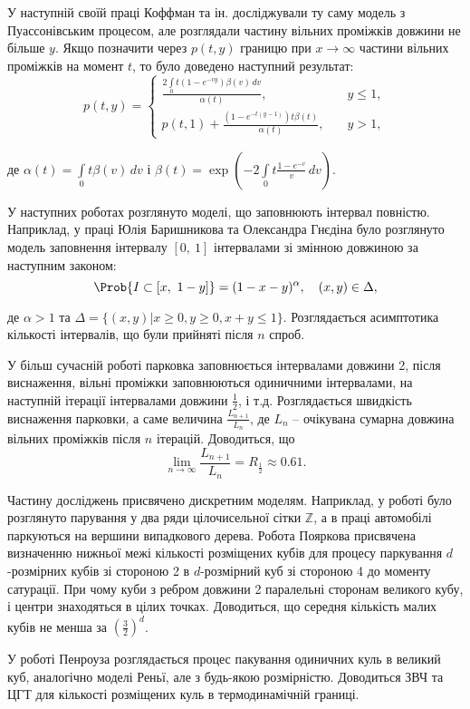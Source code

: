 У наступній своїй праці \cite{coffman2000parking} Коффман та ін. досліджували ту саму модель з Пуассонівським процесом, але розглядали частину вільних проміжків довжини не більше $y$. Якщо позначити через $p(t,y)$ границю при $x \rightarrow \infty$ частини вільних проміжків на момент $t$, то було доведено наступний результат:
\begin{equation}
p(t,y)=\begin{cases}
\frac{2\int\limits_{0}{t} (1 - e^{-vy})\beta(v)\,dv}{\alpha(t)}, &\quad y \leq 1,\\
p(t,1) + \frac{(1 - e^{-t(y-1)})t\beta(t)}{\alpha(t)}, &\quad y > 1,
\end{cases}
\end{equation}

де $\alpha(t) = \int\limits_{0}{t}\beta(v)\,dv$ і $\beta(t) = \exp\left(-2\int\limits_{0}{t} \frac{1 - e^{-v}}{v}\,dv\right)$.

У наступних роботах розглянуто моделі, що заповнюють інтервал повністю. Наприклад, у праці Юлія Баришникова та Олександра Гнєдіна \cite{baryshnikov1962} було розглянуто модель заповнення інтервалу $[0,~1]$ інтервалами зі змінною довжиною за наступним законом:
\begin{equation}
\Prob{I \subset [x,~ 1 - y]} = (1 - x - y)^\alpha, \quad (x,y) \in \Delta,
\end{equation}

де $\alpha > 1$ та $\Delta =\{(x,y)| x \geq 0, y \geq 0, x + y \leq 1 \}$. Розглядається асимптотика кількості інтервалів, що були прийняті після $n$ спроб.

У більш сучасній роботі \cite{exhaustion2017mackey} парковка заповнюється інтервалами довжини 2, після виснаження, вільні проміжки заповнюються одиничними інтервалами, на наступній ітерації інтервалами довжини $\frac{1}{2}$, і т.д. Розглядається швидкість виснаження парковки, а саме величина $\frac{L_{n+1}}{L_{n}}$, де $L_{n}$ -- очікувана сумарна довжина вільних проміжків після $n$ ітерацій. Доводиться, що
\begin{equation}
\lim\limits_{n \rightarrow \infty} \frac{L_{n+1}}{L_{n}} = R_{\frac{1}{2}} \approx 0.61.
\end{equation}

Частину досліджень присвячено дискретним моделям. Наприклад, у роботі \cite{fleurke2009} було розглянуто парування у два ряди цілочисельної сітки $\mathbb{Z}$, а в праці \cite{dehling2008} автомобілі паркуються на вершини випадкового дерева. Робота Пояркова присвячена визначенню нижньої межі кількості розміщених кубів для процесу паркування $d$-розмірних кубів зі стороною 2 в $d$-розмірний куб зі стороною 4 до моменту сатурації. При чому куби з ребром довжини 2 паралельні сторонам великого кубу, і центри знаходяться в цілих точках. Доводиться, що середня кількість малих кубів не менша за $\left(\frac{3}{2}\right)^d$.

У роботі Пенроуза \cite{penrose2002} розглядається процес пакування одиничних куль в великий куб, аналогічно моделі Реньї, але з будь-якою розмірністю. Доводиться ЗВЧ та ЦГТ для кількості розміщених куль в термодинамічній границі.

\nocite{itoh1999}
\nocite{penrose2001cmp}
\nocite{itoh1986}
\nocite{solomon1986}
\nocite{mackenzie1962}
